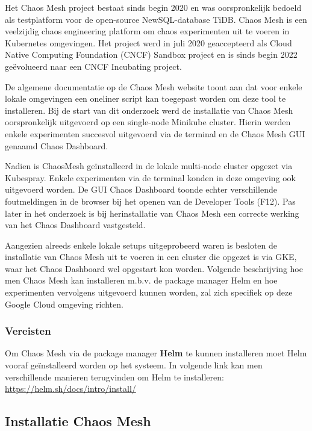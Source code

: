 Het Chaos Mesh project bestaat sinds begin 2020 en was oorspronkelijk bedoeld als testplatform voor de open-source NewSQL-database TiDB. Chaos Mesh is een veelzijdig chaos engineering platform om chaos experimenten uit te voeren in Kubernetes omgevingen. Het project werd in juli 2020 geaccepteerd als Cloud Native Computing Foundation (CNCF) Sandbox project en is sinds begin 2022 geëvolueerd naar een CNCF Incubating project. \autocite{CNCF2022b}

De algemene documentatie op de Chaos Mesh website toont aan dat voor enkele lokale omgevingen een oneliner script kan toegepast worden om deze tool te installeren. \autocite{ChaosMesh2022} 
Bij de start van dit onderzoek werd de installatie van Chaos Mesh oorspronkelijk uitgevoerd op een single-node Minikube cluster. Hierin werden enkele experimenten succesvol uitgevoerd via de terminal en de Chaos Mesh GUI genaamd Chaos Dashboard.

Nadien is ChaosMesh geïnstalleerd in de lokale multi-node cluster opgezet via Kubespray. Enkele experimenten via de terminal konden in deze omgeving ook uitgevoerd worden. De GUI Chaos Dashboard toonde echter verschillende foutmeldingen in de browser bij het openen van de Developer Tools (F12). Pas later in het onderzoek is bij herinstallatie van Chaos Mesh een correcte werking van het Chaos Dashboard vastgesteld.   

Aangezien alreeds enkele lokale setups uitgeprobeerd waren is besloten de installatie van Chaos Mesh uit te voeren in een cluster die opgezet is via GKE, waar het Chaos Dashboard  wel opgestart kon worden. Volgende beschrijving hoe men Chaos Mesh kan installeren m.b.v. de package manager Helm en hoe experimenten vervolgens uitgevoerd kunnen worden, zal zich specifiek op deze Google Cloud omgeving richten. \autocite{ChaosMesh2022a}

\subsubsection {Vereisten}

Om Chaos Mesh via de package manager {\bf Helm} te kunnen installeren moet Helm vooraf geïnstalleerd worden op het systeem. In volgende link kan men verschillende manieren terugvinden om Helm te installeren: \url{https://helm.sh/docs/intro/install/}

\subsection{Installatie Chaos Mesh}

